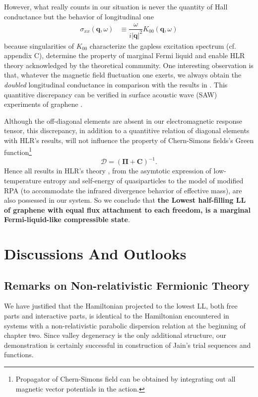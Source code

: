 \documentclass[bachelor,english,numbers]{ustcthesis}
\begin{document}
		However, what really counts in our situation is never the quantity of Hall conductance but the behavior of longitudinal one
		\begin{align}\label{2.5.13}
			\sigma_{xx}(\bm{q},\omega)&\equiv\dfrac{\omega}{i|\bm{q}|^2}K_{00}(\bm{q},\omega)
		\end{align}
		because singularities of $K_{00}$ characterize the gapless excitation spectrum (cf. appendix C), determine the property of marginal Fermi liquid \cite{stern1995singularities} and enable HLR theory acknowledged by the theoretical community. One interesting observation is that, whatever the magnetic field fluctuation one exerts, we always obtain the \emph{doubled} longitudinal conductance in comparison with the results in \cite{Halperin1995Theory}. This quantitive discrepancy can be verified in surface acoustic wave (SAW) experiments of graphene \cite{simon1998chern}.\par

		Although the off-diagonal elements are absent in our electromagnetic response tensor, this discrepancy, in addition to a quantitive relation of diagonal elements with HLR's results, will not influence the property of Chern-Simons fields's Green function\footnote{Propagator of Chern-Simons field can be obtained by integrating out all magnetic vector potentials in the action.}
		\begin{equation}\label{2.5.14}
			\mathcal{D}=(\bm{\Pi}+\bm{C})^{-1}.
		\end{equation} 
		Hence all results in HLR's theory \cite{Halperin1995Theory}, from the asymtotic expression of low-temperature entropy and self-energy of quasiparticles to the model of modified RPA (to accommodate the infrared divergence behavior of effective mass), are also possessed in our system. So we conclude that {\bf the Lowest half-filling LL of graphene with equal flux attachment to each freedom, is a marginal Fermi-liquid-like compressible state}.

\chapter{Discussions And Outlooks}

	\section{Remarks on Non-relativistic Fermionic Theory}
		\indent\par We have justified that the Hamiltonian projected to the lowest LL, both free parts and interactive parts, is identical to the Hamiltonian encountered in systems with a non-relativistic parabolic dispersion relation at the beginning of chapter two. Since valley degeneracy is the only additional structure, our demonstration is certainly successful in construction of Jain's trial sequences and functions.\par
\end{document}
